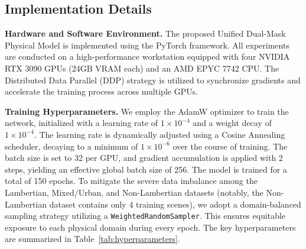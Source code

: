 \documentclass[lettersize,journal]{IEEEtran}
\begin{document}
\subsection{Implementation Details}

\textbf{Hardware and Software Environment.} 
The proposed Unified Dual-Mask Physical Model is implemented using the PyTorch framework. All experiments are conducted on a high-performance workstation equipped with four NVIDIA RTX 3090 GPUs (24GB VRAM each) and an AMD EPYC 7742 CPU. The Distributed Data Parallel (DDP) strategy is utilized to synchronize gradients and accelerate the training process across multiple GPUs.

\textbf{Training Hyperparameters.} 
We employ the AdamW optimizer to train the network, initialized with a learning rate of $1 \times 10^{-4}$ and a weight decay of $1 \times 10^{-4}$. The learning rate is dynamically adjusted using a Cosine Annealing scheduler, decaying to a minimum of $1 \times 10^{-6}$ over the course of training. The batch size is set to 32 per GPU, and gradient accumulation is applied with 2 steps, yielding an effective global batch size of 256. The model is trained for a total of 150 epochs. To mitigate the severe data imbalance among the Lambertian, Mixed/Urban, and Non-Lambertian datasets (notably, the Non-Lambertian dataset contains only 4 training scenes), we adopt a domain-balanced sampling strategy utilizing a \texttt{WeightedRandomSampler}. This ensures equitable exposure to each physical domain during every epoch. The key hyperparameters are summarized in Table~\ref{tab:hyperparameters}.

\begin{table}[!t]
\caption{Summary of Key Training Hyperparameters}
\label{tab:hyperparameters}
\centering
{}
\end{table}
\end{document}
